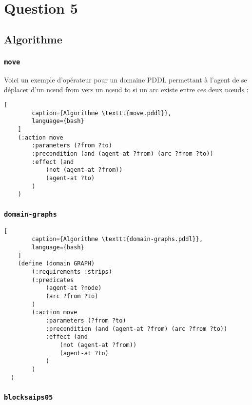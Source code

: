 \documentclass[../CSC_5RO16_TA_TP5.tex]{subfiles}
\begin{document}
\section{Question 5}
% 

\subsection{Algorithme}

\subsubsection{\texttt{move}}
\noindent Voici un exemple d'opérateur pour un domaine PDDL permettant à l'agent de se déplacer d'un nœud from vers un nœud to si un arc existe entre ces deux nœuds :

\begin{scriptsize}\mycode
    \begin{lstlisting}[
        caption={Algorithme \texttt{move.pddl}},
        language={bash}
    ]
    (:action move
        :parameters (?from ?to)
        :precondition (and (agent-at ?from) (arc ?from ?to))
        :effect (and 
            (not (agent-at ?from))
            (agent-at ?to)
        )
    )
    \end{lstlisting}
\end{scriptsize}

\subsubsection{\texttt{domain-graphs}}

\begin{scriptsize}\mycode
    \begin{lstlisting}[
        caption={Algorithme \texttt{domain-graphs.pddl}},
        language={bash}
    ]
    (define (domain GRAPH)
        (:requirements :strips)
        (:predicates 
            (agent-at ?node)
            (arc ?from ?to)
        )
        (:action move
            :parameters (?from ?to)
            :precondition (and (agent-at ?from) (arc ?from ?to))
            :effect (and 
                (not (agent-at ?from))
                (agent-at ?to)
            )
        )
  )
    \end{lstlisting}
\end{scriptsize}

\subsubsection{\texttt{blocksaips05}}
\end{document}
